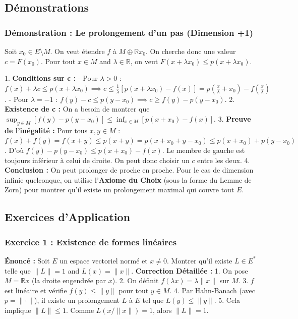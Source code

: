 \documentclass[11pt,a4paper]{article}
\begin{document}
\subsection{Démonstrations}

\subsubsection{Démonstration : Le prolongement d'un pas (Dimension +1)}

Soit $x_0 \in E \setminus M$. On veut étendre $f$ à $M \oplus \mathbb{R}x_0$. On cherche donc une valeur $c = F(x_0)$.
Pour tout $x \in M$ and $\lambda \in \mathbb{R}$, on veut $F(x + \lambda x_0) \le p(x + \lambda x_0)$.

1. \textbf{Conditions sur c :}
   - Pour $\lambda > 0$ : $f(x) + \lambda c \le p(x + \lambda x_0) \implies c \le \frac{1}{\lambda} [ p(x + \lambda x_0) - f(x) ] = p(\frac{x}{\lambda} + x_0) - f(\frac{x}{\lambda})$.
   - Pour $\lambda = -1$ : $f(y) - c \le p(y - x_0) \implies c \ge f(y) - p(y - x_0)$.
2. \textbf{Existence de c :} On a besoin de montrer que $\sup_{y \in M} [f(y) - p(y-x_0)] \le \inf_{x \in M} [p(x+x_0) - f(x)]$.
3. \textbf{Preuve de l'inégalité :} Pour tous $x, y \in M$ :
   $f(x) + f(y) = f(x+y) \le p(x+y) = p(x+x_0 + y-x_0) \le p(x+x_0) + p(y-x_0)$.
   D'où $f(y) - p(y-x_0) \le p(x+x_0) - f(x)$.
   Le membre de gauche est toujours inférieur à celui de droite. On peut donc choisir un $c$ entre les deux.
4. \textbf{Conclusion :} On peut prolonger de proche en proche. Pour le cas de dimension infinie quelconque, on utilise l'\textbf{Axiome du Choix} (sous la forme du Lemme de Zorn) pour montrer qu'il existe un prolongement maximal qui couvre tout $E$.

\subsection{Exercices d'Application}

\subsubsection{Exercice 1 : Existence de formes linéaires}
\textbf{Énoncé :} Soit $E$ un espace vectoriel normé et $x \neq 0$. Montrer qu'il existe $L \in E^*$ telle que $\|L\|=1$ and $L(x) = \|x\|$.
\textbf{Correction Détaillée :}
1. On pose $M = \mathbb{R}x$ (la droite engendrée par $x$).
2. On définit $f(\lambda x) = \lambda \|x\|$ sur $M$.
3. $f$ est linéaire et vérifie $f(y) \le \|y\|$ pour tout $y \in M$.
4. Par Hahn-Banach (avec $p = \| \cdot \|$), il existe un prolongement $L$ à $E$ tel que $L(y) \le \|y\|$.
5. Cela implique $\|L\| \le 1$. Comme $L(x/\|x\|) = 1$, alors $\|L\|=1$.
\end{document}
